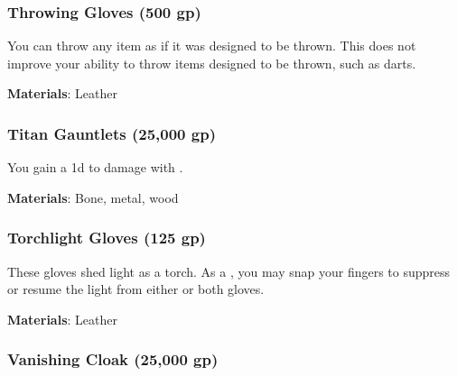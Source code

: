 \lowercase{\hypertarget{item:Throwing Gloves}{}}\label{item:Throwing Gloves}
\hypertarget{item:Throwing Gloves}{\subsubsection{Throwing Gloves\hfill{} (500 gp)}}

You can throw any item as if it was designed to be thrown.
This does not improve your ability to throw items designed to be thrown, such as darts.



\vspace{0.25em}
\textbf{Materials}: Leather


\lowercase{\hypertarget{item:Titan Gauntlets}{}}\label{item:Titan Gauntlets}
\hypertarget{item:Titan Gauntlets}{\subsubsection{Titan Gauntlets\hfill{} (25,000 gp)}}

You gain a \plus1d  to damage with .



\vspace{0.25em}
\textbf{Materials}: Bone, metal, wood


\lowercase{\hypertarget{item:Torchlight Gloves}{}}\label{item:Torchlight Gloves}
\hypertarget{item:Torchlight Gloves}{\subsubsection{Torchlight Gloves\hfill{} (125 gp)}}

These gloves shed light as a torch.
As a , you may snap your fingers to suppress or resume the light from either or both gloves.



\vspace{0.25em}
\textbf{Materials}: Leather


\lowercase{\hypertarget{item:Vanishing Cloak}{}}\label{item:Vanishing Cloak}
\hypertarget{item:Vanishing Cloak}{\subsubsection{Vanishing Cloak\hfill{} (25,000 gp)}}

